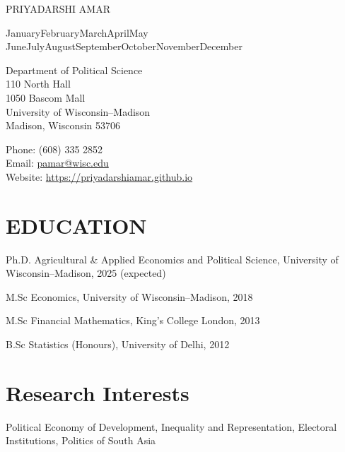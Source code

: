 \documentclass[10pt,letterpaper]{article}
\def\name{Priyadarshi Amar}
\newcommand{\titlefont}[1]{{\titleface\large\MakeUppercase{#1}}}
\renewenvironment{itemize}{
  \begin{list}{}{
      \setlength{\leftmargin}{1.5em}
      \setlength{\itemsep}{0.25em}
      \setlength{\parskip}{0pt}
      \setlength{\parsep}{0.25em}
    }
}{
  \end{list}
}
\renewcommand{\today}{\ifcase \month \or January\or February\or March\or April\or May%
\or June\or July\or August\or September\or October\or November\or December\fi%
\space \number \year}
\begin{document}
\titlefont{\name}


\bigskip
\today

\bigskip
\begin{minipage}[t]{0.495\textwidth}
  Department of Political Science \\
  110 North Hall \\
  1050 Bascom Mall \\
  University of Wisconsin--Madison \\
  Madison, Wisconsin 53706  \\
\end{minipage}
\begin{minipage}[t]{0.695\textwidth}
Phone:  (608) 335 2852 \\
 Email: \href{mailto:pamar@wisc.edu}{pamar@wisc.edu} \\
 Website: \href{https://priyadarshiamar.github.io}{https://priyadarshiamar.github.io} \\
\end{minipage}


\section*{EDUCATION}

\begin{itemize}
  \item Ph.D. Agricultural \& Applied Economics and Political Science, University of Wisconsin--Madison, 2025 (expected)
  \item M.Sc Economics, University of Wisconsin--Madison, 2018
  \item M.Sc Financial Mathematics, King's College London, 2013
    \item B.Sc Statistics (Honours), University of Delhi, 2012
\end{itemize}

\section*{Research Interests}
Political Economy of Development, Inequality and Representation, Electoral Institutions, Politics of South Asia
\end{document}
